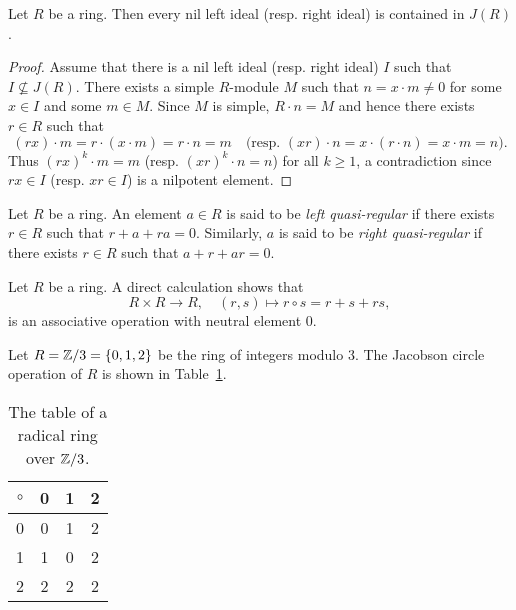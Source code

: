 \begin{proposition}
	\label{pro:nilJ}
	Let $R$ be a ring. Then every nil left ideal (resp. right ideal) is contained in $J(R)$.
\end{proposition}

\begin{proof}
	Assume that there is a nil left ideal (resp. right ideal) $I$ such that 
	$I\not\subseteq J(R)$. There exists a simple $R$-module $M$ such that 
	$n=x\cdot m\ne 0$ for some $x\in I$ and some $m\in M$. Since $M$ is simple,
	$R\cdot n=M$ and hence there exists $r\in R$ such that 
	\[
	(rx)\cdot m=r\cdot (x\cdot m)=r\cdot n=m\quad\text{(resp.
	$(xr)\cdot n=x\cdot (r\cdot n)=x\cdot m=n$).}
	\]
	Thus $(rx)^k\cdot m=m$ (resp. $(xr)^k\cdot n=n$) for all 
	$k\geq1$, a contradiction since $rx\in I$ (resp. $xr\in I$) is a nilpotent element. 
\end{proof}

\begin{definition}
Let $R$ be a ring. An element $a\in R$ is said to be 
\emph{left quasi-regular} if there exists $r\in R$ such that $r+a+ra=0$. Similarly, 
$a$ is said to be \emph{right quasi-regular} if there exists $r\in R$ such that $a+r+ar=0$. 
\end{definition}

Let $R$ be a ring. A direct calculation shows that
\[
R\times R\to R,
\quad
(r,s)\mapsto r\circ s=r+s+rs,
\]
is an associative operation with neutral element $0$.

\begin{example}
Let $R=\mathbb{Z}/3=\{0,1,2\}$ be the ring of integers modulo 3. 
The Jacobson circle 
operation of $R$ is shown in Table~\ref{tab:radical}.
\end{example}

	\begin{table}[bht]
  		\caption{The table of a radical ring over $\mathbb{Z}/3$.}
		\centering
		\begin{tabular}{c|ccc}
			$\circ$ & 0 & 1 & 2\tabularnewline
			\hline
			0 & 0 & 1 & 2\tabularnewline
			1 & 1 & 0 & 2\tabularnewline
			2 & 2 & 2 & 2\tabularnewline
		\end{tabular}
    \label{tab:radical}
 	\end{table}



